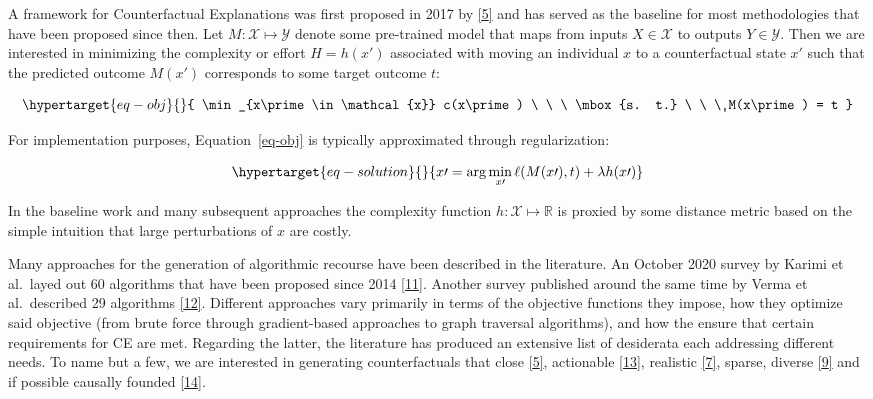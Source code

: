 \documentclass[
  conference]{IEEEtran}
\begin{document}
A framework for Counterfactual Explanations was first proposed in 2017
by \protect\hyperlink{ref-wachter2017counterfactual}{{[}5{]}} and has
served as the baseline for most methodologies that have been proposed
since then. Let \(M: \mathcal{X} \mapsto \mathcal{Y}\) denote some
pre-trained model that maps from inputs \(X \in \mathcal{X}\) to outputs
\(Y \in \mathcal{Y}\). Then we are interested in minimizing the
complexity or effort \(H=h(x\prime)\) associated with moving an
individual \(x\) to a counterfactual state \(x\prime\) such that the
predicted outcome \(M(x\prime)\) corresponds to some target outcome
\(t\):

\begin{equation}\protect\hypertarget{eq-obj}{}{
\min_{x\prime \in \mathcal{x}} c(x\prime) \ \ \ \mbox{s. t.} \ \ \ M(x\prime) = t
}\label{eq-obj}\end{equation}

For implementation purposes, Equation~\ref{eq-obj} is typically
approximated through regularization:

\begin{equation}\protect\hypertarget{eq-solution}{}{
x\prime = \arg \min_{x\prime}  \ell(M(x\prime),t) + \lambda h(x\prime)
}\label{eq-solution}\end{equation}

In the baseline work and many subsequent approaches the complexity
function \(h: \mathcal{X} \mapsto \mathbb{R}\) is proxied by some
distance metric based on the simple intuition that large perturbations
of \(x\) are costly.

Many approaches for the generation of algorithmic recourse have been
described in the literature. An October 2020 survey by Karimi et
al.~layed out 60 algorithms that have been proposed since 2014
\protect\hyperlink{ref-karimi2020survey}{{[}11{]}}. Another survey
published around the same time by Verma et al.~described 29 algorithms
\protect\hyperlink{ref-verma2020counterfactual}{{[}12{]}}. Different
approaches vary primarily in terms of the objective functions they
impose, how they optimize said objective (from brute force through
gradient-based approaches to graph traversal algorithms), and how the
ensure that certain requirements for CE are met. Regarding the latter,
the literature has produced an extensive list of desiderata each
addressing different needs. To name but a few, we are interested in
generating counterfactuals that close
\protect\hyperlink{ref-wachter2017counterfactual}{{[}5{]}}, actionable
\protect\hyperlink{ref-ustun2019actionable}{{[}13{]}}, realistic
\protect\hyperlink{ref-schut2021generating}{{[}7{]}}, sparse, diverse
\protect\hyperlink{ref-mothilal2020explaining}{{[}9{]}} and if possible
causally founded
\protect\hyperlink{ref-karimi2021algorithmic}{{[}14{]}}.
\end{document}
